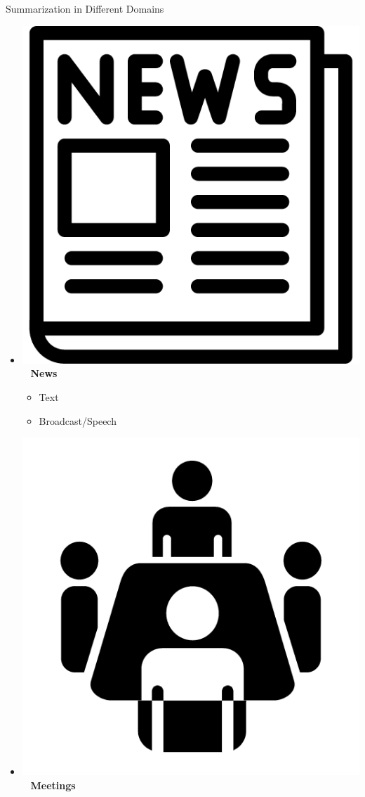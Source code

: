 \documentclass[xcolor={table}]{beamer}
\begin{document}
\begin{frame}{Summarization in Different Domains}
    \begin{itemize}
        \item[] \includegraphics[scale=.017]{news_icon}~ \textbf{News} 
    \begin{itemize}
        \item Text {\tiny\cite{lin2000automated,erkan2004lexrank,conroy2005classy,lin2011class}}
        \item Broadcast/Speech {\tiny\cite{maskey2005comparing}}
    \end{itemize}
\item[] \includegraphics[scale=.02]{meeting_icon}~ \textbf{Meetings  } {\tiny\cite{gillick2009global}}

\end{itemize}
\end{frame}
\end{document}
